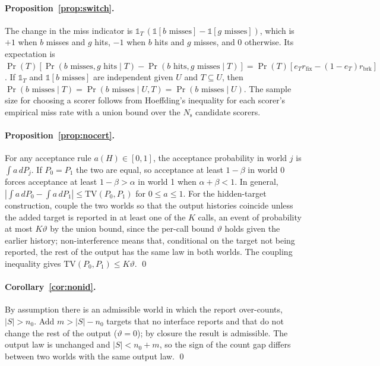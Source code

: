 \paragraph{Proposition~\ref{prop:switch}.} The change in the miss indicator is $\mathbb{1}_T\,(\mathbb{1}[b\text{ misses}]-\mathbb{1}[g\text{ misses}])$, which is $+1$ when $b$ misses and $g$ hits, $-1$ when $b$ hits and $g$ misses, and $0$ otherwise. Its expectation is $\Pr(T)[\Pr(b\text{ misses},g\text{ hits}\mid T)-\Pr(b\text{ hits},g\text{ misses}\mid T)]=\Pr(T)[e_Tr_{\mathrm{fix}}-(1-e_T)r_{\mathrm{brk}}]$. If $\mathbb{1}_T$ and $\mathbb{1}[b\text{ misses}]$ are independent given $U$ and $T\subseteq U$, then $\Pr(b\text{ misses}\mid T)=\Pr(b\text{ misses}\mid U,T)=\Pr(b\text{ misses}\mid U)$. The sample size for choosing a scorer follows from Hoeffding's inequality for each scorer's empirical miss rate with a union bound over the $N_{\mathrm{s}}$ candidate scorers.

\paragraph{Proposition~\ref{prop:nocert}.} For any acceptance rule $a(H)\in[0,1]$, the acceptance probability in world $j$ is $\int a\,dP_j$. If $P_0=P_1$ the two are equal, so acceptance at least $1-\beta$ in world 0 forces acceptance at least $1-\beta>\alpha$ in world 1 when $\alpha+\beta<1$. In general, $|\int a\,dP_0-\int a\,dP_1|\le\mathrm{TV}(P_0,P_1)$ for $0\le a\le1$. For the hidden-target construction, couple the two worlds so that the output histories coincide unless the added target is reported in at least one of the $K$ calls, an event of probability at most $K\vartheta$ by the union bound, since the per-call bound $\vartheta$ holds given the earlier history; non-interference means that, conditional on the target not being reported, the rest of the output has the same law in both worlds. The coupling inequality gives $\mathrm{TV}(P_0,P_1)\le K\vartheta$. \qed

\paragraph{Corollary~\ref{cor:nonid}.} By assumption there is an admissible world in which the report over-counts, $|S|>n_0$. Add $m>|S|-n_0$ targets that no interface reports and that do not change the rest of the output ($\vartheta=0$); by closure the result is admissible. The output law is unchanged and $|S|<n_0+m$, so the sign of the count gap differs between two worlds with the same output law. \qed

